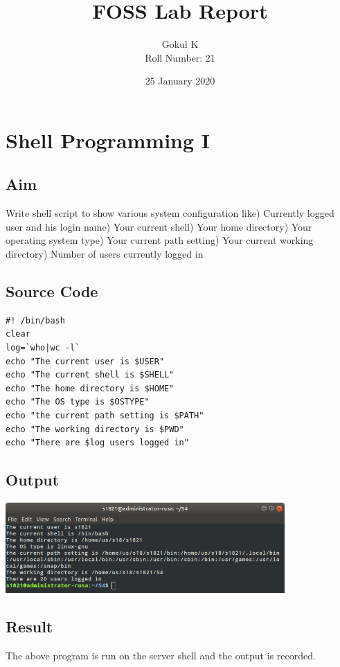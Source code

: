 \documentclass{article}
\begin{document}
\title{FOSS Lab Report}
\author{Gokul K\\[2\baselineskip]
Roll Number: 21\\[2\baselineskip]}
\date{25 January 2020}

\maketitle

\setcounter{section}{3}
\section{Shell Programming I}
\subsection{Aim}
Write shell script to show various system configuration like) Currently logged user and his login name) Your current shell) Your home directory) Your operating system type) Your current path setting) Your current working directory) Number of users currently logged in\newline
\subsection{Source Code}
\begin{verbatim}
#! /bin/bash
clear
log=`who|wc -l`
echo "The current user is $USER"
echo "The current shell is $SHELL"
echo "The home directory is $HOME"
echo "The OS type is $OSTYPE"
echo "the current path setting is $PATH"
echo "The working directory is $PWD"
echo "There are $log users logged in"
\end{verbatim}

\subsection{Output}
\includegraphics[width=0.8\textwidth]{img/p4/ss.png}

\subsection{Result}
The above program is run on the server shell and the output is recorded.
\end{document}
